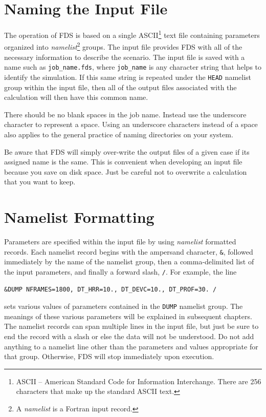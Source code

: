 \documentclass[11pt]{book}
\newcommand{\ct}{\tt\small}
\begin{document}
\section{Naming the Input File}

The operation of FDS is based on a single ASCII\footnote{ASCII -- American Standard Code
for Information Interchange. There are 256 characters that make up the standard ASCII text.} text file containing parameters organized into
{\em namelist}\footnote{A {\em namelist} is a Fortran input record.} groups.
The input file provides FDS  with all of the necessary information to
describe the scenario.
The input file is saved with a name such as {\ct job\_name.fds},
where {\ct job\_name} is any character string that helps to identify
the simulation. If this same string is repeated under the {\ct HEAD} namelist group within the
input file, then all of the output files associated with the calculation will then have this common name.

There should be no blank spaces in the job name. Instead use the underscore
character to represent a space.  Using an underscore characters instead of a space also applies
to the general practice of naming directories on your system.

Be aware that FDS will simply over-write the output files of a given case if its assigned
name is the same. This is convenient when developing an input file because you save on disk space. Just be careful
not to overwrite a calculation that you want to keep.



\section{Namelist Formatting}

\noindent
Parameters are specified within the input file by using {\em namelist} formatted records.
Each namelist record begins with the ampersand character, {\ct \&}, followed
immediately by the name of the namelist group, then a comma-delimited list of the input parameters, and
finally a forward slash, {\ct /}. For example, the line
\footnotesize
\begin{verbatim}
&DUMP NFRAMES=1800, DT_HRR=10., DT_DEVC=10., DT_PROF=30. /
\end{verbatim}\normalsize
\noindent sets various values of parameters contained in the {\ct DUMP} namelist group. The meanings of these various parameters will
be explained in subsequent chapters. The namelist records can span multiple lines in the input file, but just be sure to
end the record with a slash or else the data will not be understood. Do not add anything to a namelist line other than the
parameters and values appropriate for that group. Otherwise, FDS will stop immediately upon execution.
\end{document}
